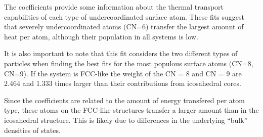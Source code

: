 \documentclass[journal = jpccck, manuscript = suppinfo]{achemso}
\begin{document}
The coefficients provide some information about the thermal transport
capabilities of each type of undercoordinated surface atom. These fits
suggest that severely undercoordinated atoms (CN=6) transfer the
largest amount of heat per atom, although their population in all
systems is low.

It is also important to note that this fit considers the two different
types of particles when finding the best fits for the most populous
surface atoms (CN=8, CN=9).  If the system is FCC-like the weight of
the CN = 8 and CN = 9 are 2.464 and 1.333 times larger than their
contributions from icosahedral cores.

Since the coefficients are related to the amount of energy transfered
per atom type, these atoms on the FCC-like structures transfer a
larger amount than in the icosahedral structure.  This is likely due
to differences in the underlying ``bulk'' densities of states.


\newpage


\end{document}
